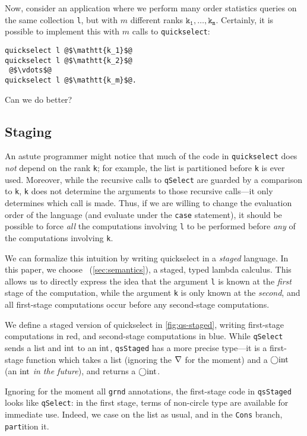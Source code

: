 \begin{abstrsyn}
Now, consider an application where we perform many order statistics queries on
the same collection \texttt{l}, but with $m$ different ranks
$\mathtt{k_1},\dots,\mathtt{k_m}$.
Certainly, it is possible to implement this with $m$ calls to
\texttt{quickselect}:
%
\begin{lstlisting}
quickselect l @$\mathtt{k_1}$@
quickselect l @$\mathtt{k_2}$@
 @$\vdots$@ 
quickselect l @$\mathtt{k_m}$@.
\end{lstlisting}
%
Can we do better?

\subsection{Staging}

An astute programmer might notice that much of the code in \texttt{quickselect}
does \emph{not} depend on the rank \texttt{k}; for example, the list is
partitioned before \texttt{k} is ever used. Moreover, while the recursive calls
to \texttt{qSelect} are guarded by a comparison to \texttt{k}, \texttt{k} does
not determine the arguments to those recursive calls---it only determines which
call is made. Thus, if we are willing to change the evaluation order of the
language (and evaluate under the \texttt{case} statement), it should be possible
to force \emph{all} the computations involving \texttt{l} to be performed before
\emph{any} of the computations involving \texttt{k}.

We can formalize this intuition by writing quickselect in a \emph{staged}
language. In this paper, we choose \lang\ (\ref{sec:semantics}), a staged, typed
lambda calculus. This allows us to directly express the idea that the argument
\texttt{l} is known at the \emph{first} stage of the computation, while the
argument \texttt{k} is only known at the \emph{second}, and all
first-stage computations occur before any second-stage computations.

We define a staged version of quickselect in \ref{fig:qs-staged}, writing
first-stage computations in red, and second-stage computations in blue. While
\texttt{qSelect} sends a \textrm{list} and ${\rm int}$ to an ${\rm int}$,
\texttt{qsStaged} has a more precise type---it is a first-stage function which
takes a \textrm{list} (ignoring the $\nabla$ for the moment) and a $\bigcirc{\rm int}$
(an ${\rm int}$ \emph{in the future}), and returns a $\bigcirc{\rm int}$.

Ignoring for the moment all \texttt{grnd} annotations, the first-stage code in
\texttt{qsStaged} looks like \texttt{qSelect}: in the first stage, terms of
non-circle type are available for immediate use. Indeed, we case on the list as
usual, and in the \texttt{Cons} branch, \texttt{part}ition it.


\end{abstrsyn}
